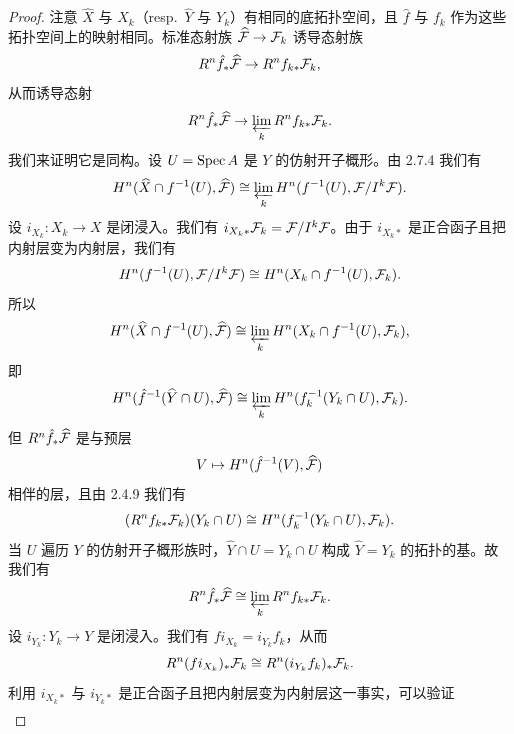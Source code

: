 \begin{proof}
注意 $\widehat{X}$ 与 $X_k$（resp.\ $\widehat{Y}$ 与 $Y_k$）有相同的底拓扑空间，且 $\hat{f}$ 与 $f_k$ 作为这些拓扑空间上的映射相同。标准态射族 $\widehat{\mathcal{F}}\to\mathcal{F}_k$ 诱导态射族
\begin{equation*}
R^n\hat{f}_*\widehat{\mathcal{F}}\to R^nf_{k*}\mathcal{F}_k,
\end{equation*}
从而诱导态射
\begin{equation*}
R^n\hat{f}_*\widehat{\mathcal{F}}\to\varprojlim_k R^nf_{k*}\mathcal{F}_k.
\end{equation*}
我们来证明它是同构。设 $U=\operatorname{Spec} A$ 是 $Y$ 的仿射开子概形。由 2.7.4 我们有
\begin{equation*}
H^n(\widehat{X}\cap f^{-1}(U),\widehat{\mathcal{F}})\cong\varprojlim_k H^n(f^{-1}(U),\mathcal{F}/I^k\mathcal{F}).
\end{equation*}
设 $i_{X_k}\colon X_k\to X$ 是闭浸入。我们有 $i_{X_k*}\mathcal{F}_k=\mathcal{F}/I^k\mathcal{F}$。由于 $i_{X_k*}$ 是正合函子且把内射层变为内射层，我们有
\begin{equation*}
H^n(f^{-1}(U),\mathcal{F}/I^k\mathcal{F})\cong H^n(X_k\cap f^{-1}(U),\mathcal{F}_k).
\end{equation*}
所以
\begin{equation*}
H^n(\widehat{X}\cap f^{-1}(U),\widehat{\mathcal{F}})\cong\varprojlim_k H^n(X_k\cap f^{-1}(U),\mathcal{F}_k),
\end{equation*}
即
\begin{equation*}
H^n(\hat{f}^{-1}(\widehat{Y}\cap U),\widehat{\mathcal{F}})\cong\varprojlim_k H^n(f_k^{-1}(Y_k\cap U),\mathcal{F}_k).
\end{equation*}
但 $R^n\hat{f}_*\widehat{\mathcal{F}}$ 是与预层
\begin{equation*}
V\mapsto H^n(\hat{f}^{-1}(V),\widehat{\mathcal{F}})
\end{equation*}
相伴的层，且由 2.4.9 我们有
\begin{equation*}
(R^nf_{k*}\mathcal{F}_k)(Y_k\cap U)\cong H^n(f_k^{-1}(Y_k\cap U),\mathcal{F}_k).
\end{equation*}
当 $U$ 遍历 $Y$ 的仿射开子概形族时，$\widehat{Y}\cap U=Y_k\cap U$ 构成 $\widehat{Y}=Y_k$ 的拓扑的基。故我们有
\begin{equation*}
R^n\hat{f}_*\widehat{\mathcal{F}}\cong\varprojlim_k R^nf_{k*}\mathcal{F}_k.
\end{equation*}
设 $i_{Y_k}\colon Y_k\to Y$ 是闭浸入。我们有 $fi_{X_k}=i_{Y_k}f_k$，从而
\begin{equation*}
R^n(fi_{X_k})_*\mathcal{F}_k\cong R^n(i_{Y_k}f_k)_*\mathcal{F}_k.
\end{equation*}
利用 $i_{X_k*}$ 与 $i_{Y_k*}$ 是正合函子且把内射层变为内射层这一事实，可以验证
\begin{align*}

\end{align*}
\end{proof}
